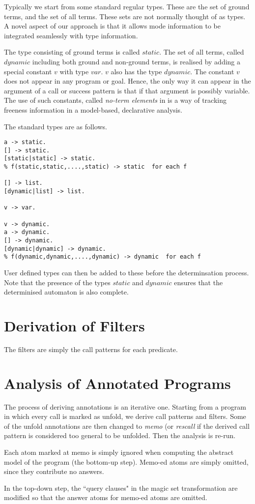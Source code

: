 \documentclass[11pt]{article}
\begin{document}
Typically we start from some standard regular types.  These are the
set of ground terms, and the set of all terms.  These sets are not normally
thought of as types.  A novel aspect of our approach is that it allows
mode information to be integrated seamlessly with type information.

The type consisting of ground terms is called $static$.
The set of all terms, called $dynamic$  including both ground and non-ground terms,
is realised by adding a special constant $v$ with type $var$.
$v$ also has the type $dynamic$.  The constant $v$ does not appear in
any program or goal.  Hence, the only way it can appear in the
argument of a call or success pattern is that if that argument is
possibly variable.  The use of such constants, called {\em no-term
elements} in  \cite{Gallagher-Boulanger-Saglam-ILPS95}
is a way of tracking freeness information in a model-based, declarative
analysis.

The standard types are as follows.

\begin{verbatim}
a -> static.
[] -> static.
[static|static] -> static.
% f(static,static,....,static) -> static  for each f

[] -> list.
[dynamic|list] -> list.

v -> var.

v -> dynamic.
a -> dynamic.
[] -> dynamic.
[dynamic|dynamic] -> dynamic.
% f(dynamic,dynamic,....,dynamic) -> dynamic  for each f
\end{verbatim}
User defined types can then be added to these before the determinsation
process.  Note that the presence of the types $static$ and $dynamic$
ensures that the determinised automaton is also complete.

\section{Derivation of Filters}

The filters are simply the call patterns for each predicate.

\section{Analysis of Annotated Programs}

The process of deriving annotations is an iterative one.
Starting from a program in which every call is marked as unfold,
we derive call patterns and filters.  Some of the unfold annotations
are then changed to {\em memo} (or {\em rescall} if the
derived call pattern is considered too general to be
unfolded.  Then the analysis is re-run.

Each atom marked at memo is simply ignored when computing the
abstract model of the program (the bottom-up step).  Memo-ed
atoms are simply omitted, since they contribute no answers.

In the top-down step, the ``query clauses" in the magic set transformation
are modified so that the answer atoms for memo-ed atoms are omitted.

 
\end{document}

